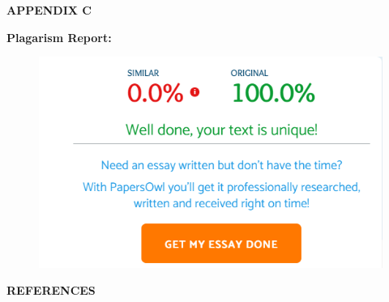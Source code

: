\documentclass[12pt]{report}
\begin{document}
\vspace{15 cm}

\clearpage

\centering

\Large\textbf{APPENDIX C}\\
\justifying
\setlength{\parindent}{4em}
\setlength{\parskip}{0.5em}
\renewcommand{\baselinestretch}{1.5}
\large
\raggedright\textbf{Plagarism Report:}
\vspace{1cm}

\begin{figure}[h]
\centering
\includegraphics[scale=0.9]{image32.png}

\end{figure}
\vspace{15 cm}


\centering
\Large\textbf{REFERENCES}
\justifying
\setlength{\parindent}{4em}
\setlength{\parskip}{0.5em}
\renewcommand{\baselinestretch}{1.5}
\normalsize
\end{document}
